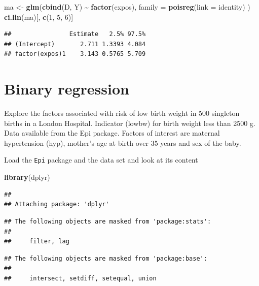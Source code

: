 \documentclass[
]{book}
\newenvironment{Shaded}{\begin{snugshade}}{\end{snugshade}}
\newcommand{\AttributeTok}[1]{\textcolor[rgb]{0.13,0.29,0.53}{#1}}
\newcommand{\DecValTok}[1]{\textcolor[rgb]{0.00,0.00,0.81}{#1}}
\newcommand{\FunctionTok}[1]{\textcolor[rgb]{0.13,0.29,0.53}{\textbf{#1}}}
\newcommand{\NormalTok}[1]{#1}
\newcommand{\OtherTok}[1]{\textcolor[rgb]{0.56,0.35,0.01}{#1}}
\newcommand{\SpecialCharTok}[1]{\textcolor[rgb]{0.81,0.36,0.00}{\textbf{#1}}}
\theoremstyle{definition}
\theoremstyle{definition}
\theoremstyle{definition}
\theoremstyle{definition}
\theoremstyle{remark}
\begin{document}
\begin{Shaded}
\begin{Highlighting}[]
\NormalTok{ma }\OtherTok{\textless{}{-}} \FunctionTok{glm}\NormalTok{(}\FunctionTok{cbind}\NormalTok{(D, Y) }\SpecialCharTok{\textasciitilde{}} \FunctionTok{factor}\NormalTok{(expos),}
  \AttributeTok{family =} \FunctionTok{poisreg}\NormalTok{(}\AttributeTok{link =}\NormalTok{ identity)}
\NormalTok{)}
\FunctionTok{ci.lin}\NormalTok{(ma)[, }\FunctionTok{c}\NormalTok{(}\DecValTok{1}\NormalTok{, }\DecValTok{5}\NormalTok{, }\DecValTok{6}\NormalTok{)]}
\end{Highlighting}
\end{Shaded}

\begin{verbatim}
##                Estimate   2.5% 97.5%
## (Intercept)       2.711 1.3393 4.084
## factor(expos)1    3.143 0.5765 5.709
\end{verbatim}

\section{Binary regression}\label{binary-regression}

Explore the factors associated with risk of low birth weight
in 500 singleton births in a London Hospital. Indicator (lowbw) for birth weight less than 2500 g. Data available from the Epi package. Factors of interest are
maternal hypertension (hyp), mother's age at birth over 35 years and sex of the baby.

Load the \texttt{Epi} package and the data set and look at its content

\begin{Shaded}
\begin{Highlighting}[]
\FunctionTok{library}\NormalTok{(dplyr)}
\end{Highlighting}
\end{Shaded}

\begin{verbatim}
## 
## Attaching package: 'dplyr'
\end{verbatim}

\begin{verbatim}
## The following objects are masked from 'package:stats':
## 
##     filter, lag
\end{verbatim}

\begin{verbatim}
## The following objects are masked from 'package:base':
## 
##     intersect, setdiff, setequal, union
\end{verbatim}
\end{document}
